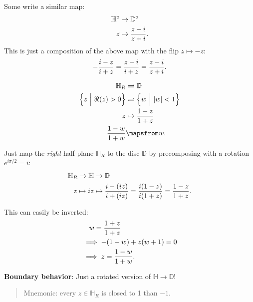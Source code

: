 \begin{remark}

Some write a similar map:
\begin{align*}
{\mathbb{H}}^\circ &\to {\mathbb{D}}^\circ \\
z &\mapsto {z-i \over z+i}
.\end{align*}
This is just a composition of the above map with the flip
\(z\mapsto -z\):
\begin{align*}
- {i-z \over i + z} = {z-i \over i+z} = {z-i \over z+i}
.\end{align*}

\end{remark}

\begin{proposition}

\begin{align*}
{\mathbb{H}}_{R} &\rightleftharpoons{\mathbb{D}}\\
\left\{{ z {~\mathrel{\Big|}~}\Re(z) > 0 }\right\} &\rightleftharpoons\left\{{ w {~\mathrel{\Big|}~}{\left\lvert {w} \right\rvert} < 1 }\right\} \\
z &\mapsto {1-z \over 1+z} \\
{1-w\over 1+w} &\mapsfrom w
.\end{align*}

Just map the \emph{right} half-plane \({\mathbb{H}}_R\) to the disc
\({\mathbb{D}}\) by precomposing with a rotation \(e^{i\pi/2} = i\):
\begin{align*}
{\mathbb{H}}_{R} \to {\mathbb{H}}&\to {\mathbb{D}}\\
z \mapsto iz &\mapsto {i- (iz) \over i + (iz)} = {i(1-z) \over i(1+z) } = {1-z \over 1+z}
.\end{align*}

This can easily be inverted:
\begin{align*}
&\quad w = {1+z \over 1+z} \\
&\implies -(1-w) + z(w+1) = 0 \\
&\implies z = {1-w \over 1+w}
.\end{align*}

\textbf{Boundary behavior}: Just a rotated version of
\({\mathbb{H}}\to {\mathbb{D}}\)!

\begin{quote}
Mnemonic: every \(z\in {\mathbb{H}}_R\) is closed to 1 than \(-1\).
\end{quote}

\end{proposition}

